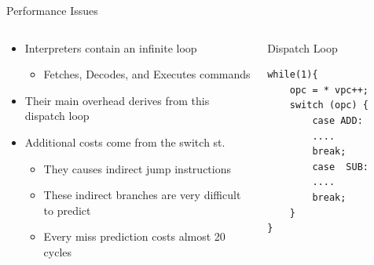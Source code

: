 \documentclass[10pt]{beamer}
\begin{document}
\begin{frame}[fragile]{Performance Issues}
    \begin{columns}[T] %
        \begin{column}{.65\textwidth}
            \begin{center}
                \begin{itemize}
                    \item {Interpreters contain an infinite loop}
                        \begin{itemize}
                            \item {Fetches, Decodes, and Executes commands}
                        \end{itemize}
                    \item {Their main overhead derives from this dispatch loop}
                    \item {Additional costs come from the switch st.}
                        \begin{itemize}
                            \item {They causes indirect jump instructions}
                            \item {These indirect branches are very difficult to predict}
                            \item {Every miss prediction costs almost 20 cycles}
                        \end{itemize}
                \end{itemize}
            \end{center}
        \end{column}%
            \hfill%
            \begin{column}{.35\textwidth}
                \begin{alertblock}{Dispatch Loop}
                    \begin{center}
                        \begin{lstlisting}[basicstyle=\footnotesize , breaklines]
while(1){
    opc = * vpc++;
    switch (opc) {
        case ADD:
        ....
        break;
        case  SUB:
        ....				
        break;
    }	
}
                        \end{lstlisting}
                    \end{center}
                \end{alertblock}
            \end{column}%
    \end{columns}
\end{frame}
\end{document}
